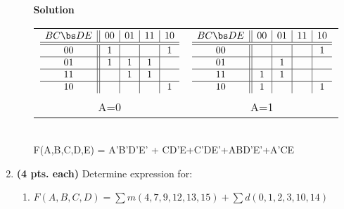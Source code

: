 \begin{enumerate}
\begin{enumerate}
                \begin{onlysolution}  \textbf{Solution} \itshape{
                        \begin{tabular}{cc}
                            $
                            \begin{array} {c||c|c|c|c}
                                B C \bs D E   & 00 & 01 & 11 & 10 \\ \hline \hline
                                00        & 1  &    &    & 1  \\ \hline
                                01        & 1  & 1  & 1  &    \\ \hline
                                11        &    & 1  & 1  &    \\ \hline
                                10        &    &    &    & 1  \\
                            \end{array}$ &
                            $
                            \begin{array} {c||c|c|c|c}
                                B C \bs D E   & 00 & 01 & 11 & 10 \\ \hline \hline
                                00        &    &    &    & 1  \\ \hline
                                01        &    & 1  &    &    \\ \hline
                                11        & 1  & 1  &    &    \\ \hline
                                10        & 1  &    &    & 1  \\
                            \end{array}$ \\
                            A=0 & A=1 \\
                        \end{tabular} \\
                        F(A,B,C,D,E) = A'B'D'E' + CD'E+C'DE'+ABD'E'+A'CE
                    }
                \end{onlysolution}

        \end{enumerate}

    \item \textbf{ (4 pts. each)} Determine \SOPmin expression for:
        \begin{enumerate}
            \item $F(A,B,C,D)=\sum m(4,7,9,12,13,15)+\sum d(0,1,2,3,10,14)$


\end{enumerate}
\end{enumerate}
